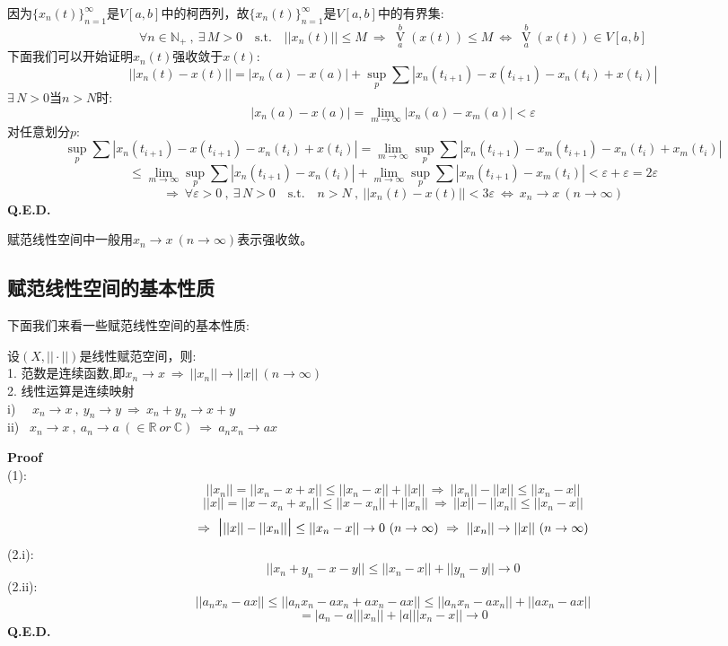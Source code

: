 因为$\{x_n(t)\}_{n=1}^{\infty}$是$V[a,b]$中的柯西列，故$\{x_n(t)\}_{n=1}^{\infty}$是$V[a,b]$中的有界集:
\[\forall n \in \mathbb{N}_+ \ , \ \exists \, M>0 \quad \text{s.t.} \quad ||x_n(t)|| \leq M \ \Rightarrow \ \mathop \text{V}\limits_a^b(x(t)) \leq M \ \Leftrightarrow \ \mathop \text{V}\limits_a^b(x(t)) \in V[a,b]\]
下面我们可以开始证明$x_n(t)$强收敛于$x(t)$:
\[||x_n(t)-x(t)||=|x_n(a)-x(a)|+\mathop \text{sup}\limits_p \sum |x_n(t_{i+1})-x(t_{i+1})-x_n(t_i)+x(t_i)|\]
$\exists \, N>0$当$n>N$时:
\[|x_n(a)-x(a)|=\lim_{m \to \infty}|x_n(a)-x_m(a)|<\varepsilon\]
对任意划分$p$:
\[\mathop \text{sup}\limits_p \sum |x_n(t_{i+1})-x(t_{i+1})-x_n(t_i)+x(t_i)|=\lim_{m \to \infty}\mathop \text{sup}\limits_p \sum |x_n(t_{i+1})-x_m(t_{i+1})-x_n(t_i)+x_m(t_i)|\]
\[\leq \lim_{m \to \infty}\mathop \text{sup}\limits_p \sum |x_n(t_{i+1})-x_n(t_i)|+\lim_{m \to \infty}\mathop \text{sup}\limits_p \sum |x_m(t_{i+1})-x_m(t_i)|<\varepsilon+\varepsilon=2\varepsilon\]
\[\Rightarrow \ \forall \varepsilon>0 \ , \ \exists \, N>0 \quad \text{s.t.} \quad n>N \ , \ ||x_n(t)-x(t)||<3\varepsilon \ \Leftrightarrow \ x_n \to x \ (n \to \infty)\]
\textbf{Q.E.D.}

赋范线性空间中一般用$x_n \to x \ (n \to \infty)$表示强收敛。

\subsection{赋范线性空间的基本性质}
下面我们来看一些赋范线性空间的基本性质:
\begin{theorem}
    设$(X,||\cdot||)$是线性赋范空间，则:\\
    1. 范数是连续函数,即$x_n \to x \ \Rightarrow \ ||x_n|| \to ||x|| \ (n \to \infty)$\\
    2. 线性运算是连续映射\\
    i) \ \ $x_n \to x \ , \ y_n \to y \ \Rightarrow \ x_n+y_n \to x+y$\\
    ii) \ $x_n \to x \ , \ a_n \to a \ (\in \mathbb{R} \ or \ \mathbb{C}) \ \Rightarrow \ a_nx_n \to ax$
\end{theorem}
\textbf{Proof}\\
(1):
\[||x_n||=||x_n-x+x|| \leq ||x_n-x||+||x|| \ \Rightarrow \ ||x_n||-||x|| \leq ||x_n-x||\]
\[||x||=||x-x_n+x_n|| \leq ||x-x_n||+||x_n|| \ \Rightarrow \ ||x||-||x_n|| \leq ||x_n-x||\]
\[\Rightarrow \ \text{\Large|} ||x||-||x_n|| \text{\Large|} \leq ||x_n-x|| \to 0 \ (n \to \infty) \ \Rightarrow \ ||x_n|| \to ||x|| \ (n \to \infty)\]
(2.i):
\[||x_n+y_n-x-y|| \leq ||x_n-x||+||y_n-y|| \to 0\]
(2.ii):
\[||a_nx_n-ax|| \leq ||a_nx_n-ax_n+ax_n-ax|| \leq ||a_nx_n-ax_n||+||ax_n-ax||\]
\[=|a_n-a|||x_n||+|a|||x_n-x|| \to 0\]
\textbf{Q.E.D.}

